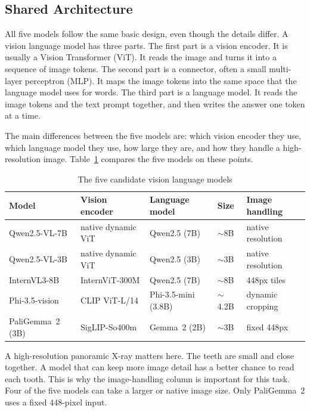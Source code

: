 \documentclass[a4paper,12pt]{report}
\begin{document}
\subsection{Shared Architecture}

All five models follow the same basic design, even though the details differ. A vision language model has three parts. The first part is a vision encoder. It is usually a Vision Transformer (ViT). It reads the image and turns it into a sequence of image tokens. The second part is a connector, often a small multi-layer perceptron (MLP). It maps the image tokens into the same space that the language model uses for words. The third part is a language model. It reads the image tokens and the text prompt together, and then writes the answer one token at a time.

The main differences between the five models are: which vision encoder they use, which language model they use, how large they are, and how they handle a high-resolution image. Table~\ref{tab:vlm-summary} compares the five models on these points.

\begin{table}[H]
\centering
\caption{The five candidate vision language models}
\label{tab:vlm-summary}
\begin{tabular}{lllll}
\toprule
Model & Vision encoder & Language model & Size & Image handling \\
\midrule
Qwen2.5-VL-7B      & native dynamic ViT   & Qwen2.5 (7B)      & $\sim$8B  & native resolution \\
Qwen2.5-VL-3B      & native dynamic ViT   & Qwen2.5 (3B)      & $\sim$3B  & native resolution \\
InternVL3-8B       & InternViT-300M       & Qwen2.5 (7B)      & $\sim$8B  & 448px tiles \\
Phi-3.5-vision     & CLIP ViT-L/14        & Phi-3.5-mini (3.8B) & $\sim$4.2B & dynamic cropping \\
PaliGemma~2 (3B)   & SigLIP-So400m        & Gemma~2 (2B)      & $\sim$3B  & fixed 448px \\
\bottomrule
\end{tabular}
\end{table}

A high-resolution panoramic X-ray matters here. The teeth are small and close together. A model that can keep more image detail has a better chance to read each tooth. This is why the image-handling column is important for this task. Four of the five models can take a larger or native image size. Only PaliGemma~2 uses a fixed 448-pixel input.
\end{document}
